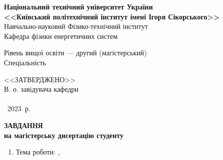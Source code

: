 %
%



\begin{spacing}{1.1}
	
\begin{center}{%
	\bfseries
	{Національний технічний університет України}\\
	{<<Київський політехнічний інститут імені Ігоря Сікорського>>}%
    }\\
	
	Навчально-науковий Фізико-технічний інститут\\
	Кафедра фізики енергетичних систем\\
\end{center}

\noindent Рівень вищої освіти --- другий (магістерський)\\
\makeatletter
\noindent Спеціальність  \@specialnist
\makeatother

\vspace*{1.5em}%
\noindent%
\hfill\begin{minipage}[t]{0.5\linewidth}
	<<ЗАТВЕРДЖЕНО>>\\
	В. о. завідувача кафедри\\
	 \\	
	 ~2023~р.\\ 
\end{minipage}

\begin{center}
	{\Large\bfseries ЗАВДАННЯ}\\
	{\bfseries на магістерську дисертацію студенту}\\
\end{center}
\makeatletter%
\noindent{} 
\makeatother%
	
\begin{enumerate}[label*=\arabic*., labelindent=0pt, itemindent=0cm]
	\makeatletter%
	\item Тема роботи: \@title,
	

\end{enumerate}
\end{spacing}
